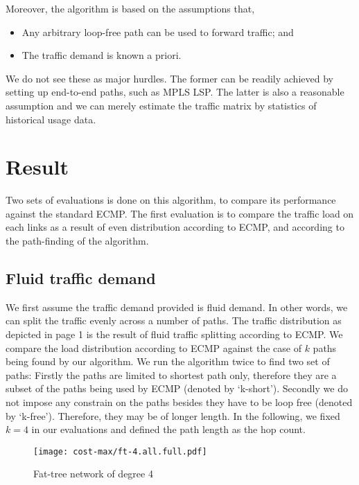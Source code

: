 \documentclass[conference]{IEEEtran}
\begin{document}
Moreover, the algorithm is based on the assumptions that,
\begin{itemize}
\item Any arbitrary loop-free path can be used to forward traffic; and
\item The traffic demand is known a priori.
\end{itemize}
We do not see these as major hurdles. The former can be readily achieved by
setting up end-to-end paths, such as MPLS LSP. The latter is also a reasonable
assumption and we can merely estimate the traffic matrix by statistics of
historical usage data.

\section{Result}

Two sets of evaluations is done on this algorithm, to compare its performance
against the standard ECMP. The first evaluation is to compare the traffic load
on each links as a result of even distribution according to ECMP, and according
to the path-finding of the algorithm.

\subsection{Fluid traffic demand}

We first assume the traffic demand provided is fluid demand. In other words, we
can split the traffic evenly across a number of paths. The traffic distribution
as depicted in page 1 is the result of fluid traffic splitting according to
ECMP. We compare the load distribution according to ECMP against the case of
$k$ paths being found by our algorithm. We run the algorithm twice to find two
set of paths: Firstly the paths are limited to shortest path only, therefore
they are a subset of the paths being used by ECMP (denoted by `k-short').
Secondly we do not impose any constrain on the paths besides they have to be
loop free (denoted by `k-free'). Therefore, they may be of longer length. In
the following, we fixed $k=4$ in our evaluations and defined the path length as
the hop count.

\begin{figure}
\centering\texttt{[image: cost-max/ft-4.all.full.pdf]}
\caption{Fat-tree network of degree 4}
\end{figure}
\end{document}
